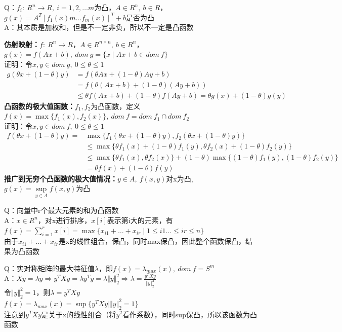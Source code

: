 \documentclass[11pt]{ctexart}         %
\begin{document}
Q：$f_i:\ R^n\to R,\ i=1,2,\dots m$为凸，$A\in R^n,\ b\in R$，$g(x)=A^T\left[f_1(x)m\dots f_m(x)\right]^T+b$是否为凸\\
A：其本质是加权和，但是不一定非负，所以不一定是凸函数

\textbf{仿射映射：}$f:\ R^n\to R$，$A\in R^{n\times n},\ b\in R^n$，$g(x)=f(Ax+b),\ dom\ g=\{x\mid Ax+b\in dom\ f\}$\\
证明：令$x,y\in dom\ g,\ 0\leq \theta \leq 1$ \\[-2.5em]
\begin{align*}
	g(\theta x+(1-\theta)y)&=f(\theta Ax+(1-\theta)Ay+b)\\
	&=f(\theta(Ax+b)+(1-\theta)(Ay+b))\\
	&\leq \theta f(Ax+b)+(1-\theta)f(Ay+b)=\theta g(x)+(1-\theta)g(y)
\end{align*}
\textbf{凸函数的极大值函数：}$f_1,f_2$为凸函数，定义$f(x)=\max \{f_1(x),f_2(x)\},\ dom\ f=dom\ f_1\cap dom\ f_2$\\
证明：令$x,y\in dom\ f,\ 0\leq \theta \leq 1$\\ [-2.5em]
\begin{align*}
	f(\theta x+(1-\theta)y)=&\max\{f_1(\theta x+(1-\theta)y),f_2(\theta x+(1-\theta)y)\}\\
	&\leq \max\{\theta f_1(x)+(1-\theta)f_1(y),\theta f_2(x)+(1-\theta)f_2(y)\}\\
	&\leq \max\{\theta f_1(x),\theta f_2(x)\}+(1-\theta)\max\{(1-\theta)f_1(y),(1-\theta)f_2(y)\}\\
	&=\theta f(x)+(1-\theta)f(y)
\end{align*}
\textbf{推广到无穷个凸函数的极大值情况：}$y\in A,\ f(x,y)$对x为凸,$g(x)=\sup\limits_{y\in A}f(x,y)$为凸

Q：向量中r个最大元素的和为凸函数\\
A：$x\in R^n$，对x进行排序，$x[i]$表示第i大的元素，有\\
\phantom{A：}$f(x)=\sum_{i=1}^{r}x[i]=\max\{x_{i1}+\dots+x_{ir}\mid 1\leq i1\dots \leq ir\leq n\}$\\
\phantom{A：}由于$x_{i1}+\dots+x_{ir}$是x的线性组合，保凸，同时max保凸，因此整个函数保凸，结果为凸函数

Q：实对称矩阵的最大特征值$\lambda$，即$f(x)=\lambda_{max}(x),\ dom\ f=S^m$\\
A：$Xy=\lambda y\Rightarrow y^TXy=\lambda y^Ty=\lambda \Vert y\Vert_2^2\Rightarrow \lambda=\frac{y^TXy}{\Vert y\Vert_2^2}$\\
\phantom{A：}令$\Vert y\Vert_2^2=1$，则$\lambda=y^TXy$\\
\phantom{A：}$f(x)=\lambda_{max}(x)=\sup\{y^TXy\mid \Vert y\Vert_2^2=1\}$\\
\phantom{A：}注意到$y^TXy$是关于x的线性组合（将$y^2$看作系数），同时sup保凸，所以该函数为凸函数
\end{document}
